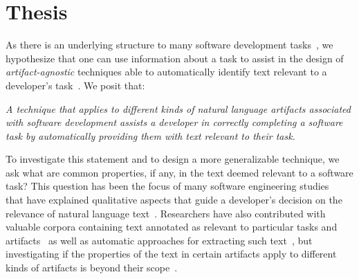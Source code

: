 

\section{Thesis}
\label{cp1:thesis}





As there is an underlying structure to many software development tasks~\cite{Murphy2005},
we hypothesize that one can use information about a task to assist in 
the design of \textit{artifact-agnostic} techniques able to  
automatically identify text relevant to a developer's task~\cite{Starke2009, Bavota2016}. We posit that:


\bigskip
\begin{bluequote}
    \textit{A technique that applies to different kinds of natural language artifacts associated with software development assists a developer in correctly completing a software task by 
    automatically providing them with text relevant to their task.  }
\end{bluequote}
\medskip



To investigate this statement and to design a more generalizable technique, we ask what are common properties, if any, in the text deemed relevant to a software task? This question has been the focus of many software engineering studies~\cite{Piorkowski2015, Piorkowski2016, chi2007, Ko2006a} that have explained qualitative aspects that 
guide a developer's decision on the relevance of natural language text~\cite{Forward2002, BenCharrada2016, Starke2009, DeGraaf2014}.
Researchers have also contributed with valuable corpora
containing text annotated as relevant to particular tasks and artifacts~\cite{nadi2019Rep, Rastkar2010}
as well as automatic approaches for extracting such text~\cite{Chaparro2017, Robillard2015, Xu2017}, 
but investigating if  the properties 
of the text in certain artifacts apply to different kinds of artifacts
is beyond their scope~\cite{hutchinson2021, bird2009}.



